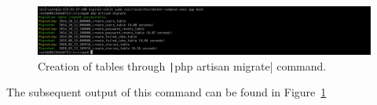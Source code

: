 \begin{figure}[!htbp]
    \centering
    \includegraphics[scale=0.3]{resources/ec2/php-artisan-migrate}
    \caption{Creation of tables through \texttt|php artisan migrate| command. }
    \label{fig:php-artisan-migrate}
\end{figure}

The subsequent output of this command can be found in Figure~\ref{fig:php-artisan-migrate}















